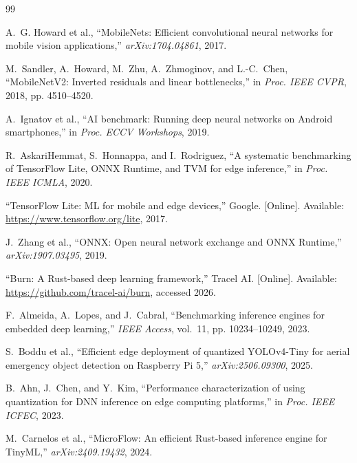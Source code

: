 \documentclass[conference]{IEEEtran}
\begin{document}
\begin{thebibliography}{99}

A.~G. Howard et al., ``MobileNets: Efficient convolutional neural networks for mobile vision applications,'' \textit{arXiv:1704.04861}, 2017.

M.~Sandler, A.~Howard, M.~Zhu, A.~Zhmoginov, and L.-C.~Chen, ``MobileNetV2: Inverted residuals and linear bottlenecks,'' in \textit{Proc. IEEE CVPR}, 2018, pp. 4510--4520.

A.~Ignatov et al., ``AI benchmark: Running deep neural networks on Android smartphones,'' in \textit{Proc. ECCV Workshops}, 2019.

R.~AskariHemmat, S.~Honnappa, and I.~Rodriguez, ``A systematic benchmarking of TensorFlow Lite, ONNX Runtime, and TVM for edge inference,'' in \textit{Proc. IEEE ICMLA}, 2020.

``TensorFlow Lite: ML for mobile and edge devices,'' Google. [Online]. Available: \url{https://www.tensorflow.org/lite}, 2017.

J.~Zhang et al., ``ONNX: Open neural network exchange and ONNX Runtime,'' \textit{arXiv:1907.03495}, 2019.

``Burn: A Rust-based deep learning framework,'' Tracel AI. [Online]. Available: \url{https://github.com/tracel-ai/burn}, accessed 2026.

F.~Almeida, A.~Lopes, and J.~Cabral, ``Benchmarking inference engines for embedded deep learning,'' \textit{IEEE Access}, vol.~11, pp. 10234--10249, 2023.

S.~Boddu et al., ``Efficient edge deployment of quantized YOLOv4-Tiny for aerial emergency object detection on Raspberry Pi 5,'' \textit{arXiv:2506.09300}, 2025.

B.~Ahn, J.~Chen, and Y.~Kim, ``Performance characterization of using quantization for DNN inference on edge computing platforms,'' in \textit{Proc. IEEE ICFEC}, 2023.

M.~Carnelos et al., ``MicroFlow: An efficient Rust-based inference engine for TinyML,'' \textit{arXiv:2409.19432}, 2024.

\end{thebibliography}
\end{document}
